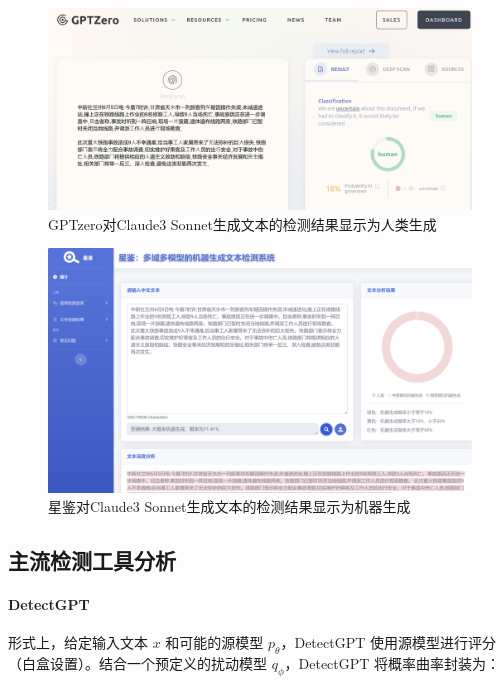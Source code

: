 \documentclass[a4paper]{report}
\begin{document}
\begin{figure}[H]
	\centering
	\includegraphics[width=\textwidth]{Claude3_GPTzero.png}
	\caption{GPTzero对Claude3 Sonnet生成文本的检测结果显示为人类生成}
	\label{fig:Claude3_GPTzero}
\end{figure}
\begin{figure}[H]
	\centering
	\includegraphics[width=\textwidth]{Claude3_星鉴.png}
	\caption{星鉴对Claude3 Sonnet生成文本的检测结果显示为机器生成}
	\label{fig:Claude3_星鉴}
\end{figure}



\subsection{主流检测工具分析}

\paragraph{DetectGPT}

形式上，给定输入文本 \(x\) 和可能的源模型 \(p_{\theta}\)，DetectGPT 使用源模型进行评分（白盒设置）。结合一个预定义的扰动模型 \(q_{\phi}\)，DetectGPT 将概率曲率封装为：
\end{document}
